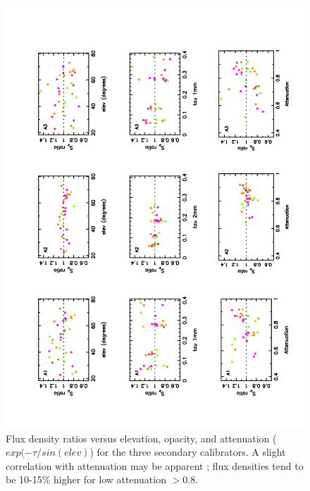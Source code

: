 \begin{figure}
\begin{center}
  \includegraphics[clip, angle=-90, scale=0.6]{Figures/Ratio_vs_elev_tau_attenuation_r9_cal_sec.pdf}
  \caption{Flux density ratios versus elevation, opacity, and attenuation ($exp(-\tau/sin(elev)$) for the three secondary
    calibrators. A slight correlation 
     with attenuation may be apparent ; flux densities tend to be  10-15\% higher for low attenuation $> 0.8$.}
\label{fig:corr_cal_sec}
\end{center}
\end{figure}

















